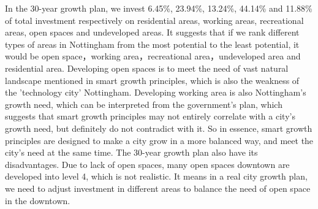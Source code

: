 In the 30-year growth plan, we invest 6.45\%, 23.94\%, 13.24\%, 44.14\% and 11.88\% of total investment respectively on residential areas, working areas, recreational areas, open spaces and undeveloped areas. It suggests that if we rank different types of areas in Nottingham from the most potential to the least potential, it would be open space，working area，recreational area，undeveloped area and residential area. Developing open spaces is to meet the need of vast natural landscape mentioned in smart growth principles, which is also the weakness of the 'technology city' Nottingham. Developing working area is also Nottingham's growth need, which can be interpreted from the government's plan, which suggests that smart growth principles may not entirely correlate with a city's growth need, but definitely do not contradict with it. So in essence, smart growth principles are designed to make a city grow in a more balanced way, and meet the city's need at the same time.
The 30-year growth plan also have its disadvantages. Due to lack of open spaces, many open spaces downtown are developed into level 4, which is not realistic. It means in a real city growth plan, we need to adjust investment in different areas to balance the need of open space in the downtown.

